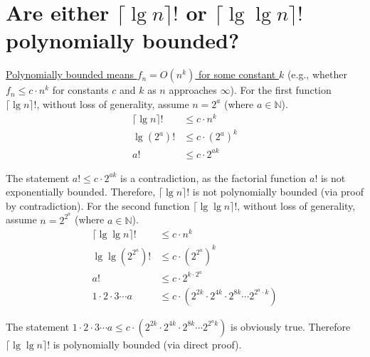 \section[Problem 1]{Are either $\lceil \lg n \rceil!$ or $\lceil \lg \lg n \rceil!$ polynomially bounded?}

\ul{Polynomially bounded means $f_n = O(n^k)$ for some constant $k$} (e.g., whether $f_n \leq c \cdot n^k$ for constants $c$ and $k$ as $n$ approaches $\infty$). For the first function $\lceil \lg n \rceil!$, without loss of generality, assume $n = 2^a$ (where $a \in \mathbb{N}$). 
\begin{align*}
	\lceil \lg n \rceil ! & \leq c \cdot n^k \\
	\lg (2^a) ! & \leq c \cdot (2^a)^k \\
	a! & \leq c \cdot 2^{ak}
\end{align*}

The statement $a! \leq c \cdot 2^{ak}$ is a contradiction, as the factorial function $a!$ is not exponentially bounded. Therefore, $\lceil \lg n \rceil!$ is not polynomially bounded (via proof by contradiction). For the second function $\lceil \lg \lg n \rceil!$, without loss of generality, assume $n = 2^{2^a}$ (where $a \in \mathbb{N}$).
\begin{align*}
	 \lceil \lg \lg n \rceil! & \leq c \cdot n^k \\
	 \lg \lg \left( 2^{2^a} \right) ! & \leq c \cdot \left( 2^{2^a} \right)^k \\
	 a! & \leq c \cdot 2^{k \cdot {2^a}} \\
	 1 \cdot 2 \cdot 3 \cdots a & \leq c \cdot \left( 2^{2k} \cdot 2^{4k} \cdot 2^{8k} \cdots 2^{2^a \cdot k} \right)
\end{align*}

The statement $1 \cdot 2 \cdot 3 \cdots a \leq c \cdot \left( 2^{2k} \cdot 2^{4k} \cdot 2^{8k} \cdots 2^{2^a k} \right)$ is obviously true. Therefore $\lceil \lg \lg n \rceil!$ is polynomially bounded (via direct proof).

